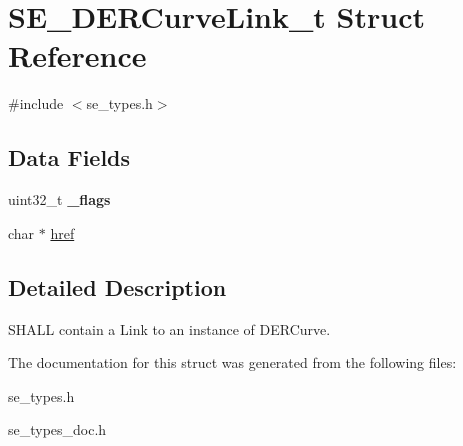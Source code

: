 \hypertarget{structSE__DERCurveLink__t}{}\section{S\+E\+\_\+\+D\+E\+R\+Curve\+Link\+\_\+t Struct Reference}
\label{structSE__DERCurveLink__t}


{\ttfamily \#include $<$se\+\_\+types.\+h$>$}

\subsection*{Data Fields}
\begin{DoxyCompactItemize}
\item 
uint32\+\_\+t {\bfseries \+\_\+flags}
\item 
char $\ast$ \hyperlink{group__DERCurveLink_ga3f821c7f1cbfabd50649ef5d3f48f446}{href}
\end{DoxyCompactItemize}


\subsection{Detailed Description}
S\+H\+A\+LL contain a Link to an instance of D\+E\+R\+Curve. 

The documentation for this struct was generated from the following files\+:\begin{DoxyCompactItemize}
\item 
se\+\_\+types.\+h\item 
se\+\_\+types\+\_\+doc.\+h\end{DoxyCompactItemize}
